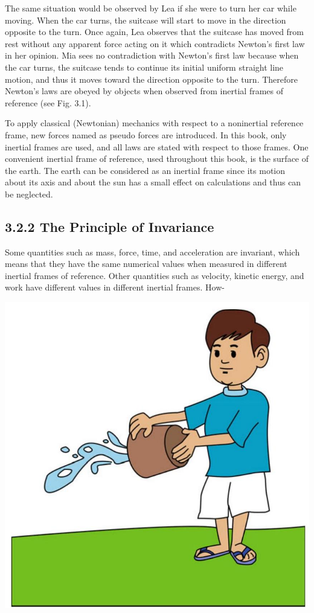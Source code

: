 \documentclass[10pt]{article}
\begin{document}
The same situation would be observed by Lea if she were to turn her car while moving. When the car turns, the suitcase will start to move in the direction opposite to the turn. Once again, Lea observes that the suitcase has moved from rest without any apparent force acting on it which contradicts Newton's first law in her opinion. Mia sees no contradiction with Newton's first law because when the car turns, the suitcase tends to continue its initial uniform straight line motion, and thus it moves toward the direction opposite to the turn. Therefore Newton's laws are obeyed by objects when observed from inertial frames of reference (see Fig. 3.1).

To apply classical (Newtonian) mechanics with respect to a noninertial reference frame, new forces named as pseudo forces are introduced. In this book, only inertial frames are used, and all laws are stated with respect to those frames. One convenient inertial frame of reference, used throughout this book, is the surface of the earth. The earth can be considered as an inertial frame since its motion about its axis and about the sun has a small effect on calculations and thus can be neglected.

\subsection*{3.2.2 The Principle of Invariance}
Some quantities such as mass, force, time, and acceleration are invariant, which means that they have the same numerical values when measured in different inertial frames of reference. Other quantities such as velocity, kinetic energy, and work have different values in different inertial frames. How-

\begin{center}
\includegraphics[max width=\textwidth]{2024_09_13_db1f357d2aad0a03eb2eg-049}
\end{center}
\end{document}
